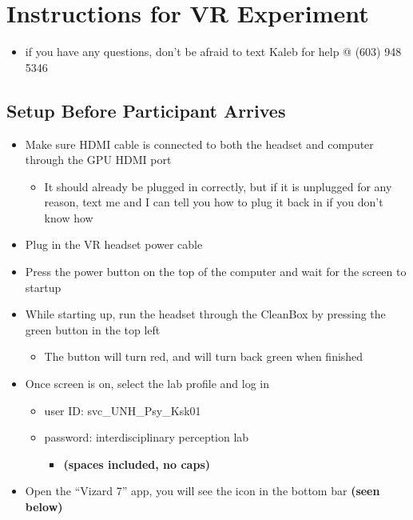 \documentclass[
]{article}
\author{}
\date{\vspace{-2.5em}}
\providecommand{\tightlist}{%
  \setlength{\itemsep}{0pt}\setlength{\parskip}{0pt}}
\begin{document}
\hypertarget{instructions-for-vr-experiment}{%
\section{Instructions for VR
Experiment}\label{instructions-for-vr-experiment}}

\begin{itemize}
\tightlist
\item
  if you have any questions, don't be afraid to text Kaleb for help @
  (603) 948 5346
\end{itemize}

\hypertarget{setup-before-participant-arrives}{%
\subsection{Setup Before Participant
Arrives}\label{setup-before-participant-arrives}}

\begin{itemize}
\tightlist
\item
  Make sure HDMI cable is connected to both the headset and computer
  through the GPU HDMI port

  \begin{itemize}
  \tightlist
  \item
    It should already be plugged in correctly, but if it is unplugged
    for any reason, text me and I can tell you how to plug it back in if
    you don't know how
  \end{itemize}
\item
  Plug in the VR headset power cable
\item
  Press the power button on the top of the computer and wait for the
  screen to startup
\item
  While starting up, run the headset through the CleanBox by pressing
  the green button in the top left

  \begin{itemize}
  \tightlist
  \item
    The button will turn red, and will turn back green when finished
  \end{itemize}
\item
  Once screen is on, select the lab profile and log in

  \begin{itemize}
  \tightlist
  \item
    user ID: svc\_UNH\_Psy\_Ksk01
  \item
    password: interdisciplinary perception lab

    \begin{itemize}
    \tightlist
    \item
      \textbf{(spaces included, no caps)}
    \end{itemize}
  \end{itemize}
\item
  Open the ``Vizard 7'' app, you will see the icon in the bottom bar
  \textbf{(seen below)}
\end{itemize}
\end{document}
